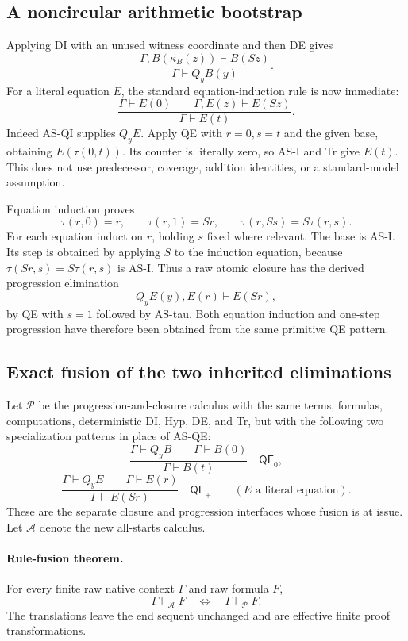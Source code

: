 \subsection{A noncircular arithmetic bootstrap}

Applying DI with an unused witness coordinate and then DE gives
\[
 \frac{\Gamma,B(\kappa_B(z))\vdash B(Sz)}
      {\Gamma\vdash Q_yB(y)}.
 \tag{AS-QI}
\]
For a literal equation $E$, the standard equation-induction rule is
now immediate:
\[
 \frac{\Gamma\vdash E(0)\qquad
       \Gamma,E(z)\vdash E(Sz)}
      {\Gamma\vdash E(t)}.
 \tag{AS-EI}
\]
Indeed AS-QI supplies $Q_yE$. Apply QE with $r=0,s=t$ and the
given base, obtaining $E(\tau(0,t))$. Its counter is literally zero,
so AS-I and Tr give $E(t)$. This does not use predecessor, coverage,
addition identities, or a standard-model assumption.

Equation induction proves
\[
 \tau(r,0)=r,\qquad
 \tau(r,1)=Sr,\qquad
 \tau(r,Ss)=S\tau(r,s).
 \tag{AS-tau}
\]
For each equation induct on $r$, holding $s$ fixed where relevant.
The base is AS-I. Its step is obtained by applying $S$ to the
induction equation, because $\tau(Sr,s)=S\tau(r,s)$ is AS-I.
Thus a raw atomic closure has the derived progression elimination
\[
 Q_yE(y),E(r)\vdash E(Sr),
 \tag{AS-progress}
\]
by QE with $s=1$ followed by AS-tau. Both equation induction and
one-step progression have therefore been obtained from the same
primitive QE pattern.

\subsection{Exact fusion of the two inherited eliminations}

Let $\mathcal P$ be the progression-and-closure calculus with the same
terms, formulas, computations, deterministic DI, Hyp, DE, and Tr, but
with the following two specialization patterns in place of AS-QE:
\[
 \frac{\Gamma\vdash Q_yB\qquad\Gamma\vdash B(0)}
      {\Gamma\vdash B(t)}
 \quad\mathsf{QE}_0,
 \tag{AS-old-zero}
\]
\[
 \frac{\Gamma\vdash Q_yE\qquad\Gamma\vdash E(r)}
      {\Gamma\vdash E(Sr)}
 \quad\mathsf{QE}_+\qquad(E\text{ a literal equation}).
 \tag{AS-old-plus}
\]
These are the separate closure and progression interfaces whose fusion
is at issue. Let $\mathcal A$ denote the new all-starts calculus.

\paragraph{Rule-fusion theorem.}
For every finite raw native context $\Gamma$ and raw formula $F$,
\[
       \Gamma\vdash_{\mathcal A}F
       \quad\Longleftrightarrow\quad
       \Gamma\vdash_{\mathcal P}F.
 \tag{AS-fusion}
\]
The translations leave the end sequent unchanged and are effective
finite proof transformations.

